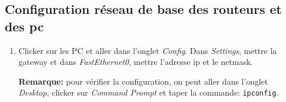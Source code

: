 \documentclass[a4paper]{article}
\begin{document}
\subsection{Configuration réseau de base des routeurs et des pc}





\begin{enumerate}



\item Clicker sur les PC et aller dans l'onglet \textit{Config}. Dans \textit{Settings}, mettre la gateway et dans \textit{FastEthernet0}, mettre l'adresse ip et le netmask.
\begin{example}
    \textbf{Remarque:} pour vérifier la configuration, on peut aller dans l'onglet \textit{Desktop}, clicker sur \textit{Command Prompt} et taper la commande: \texttt{ipconfig}.
\end{example}




\end{enumerate}
\end{document}
